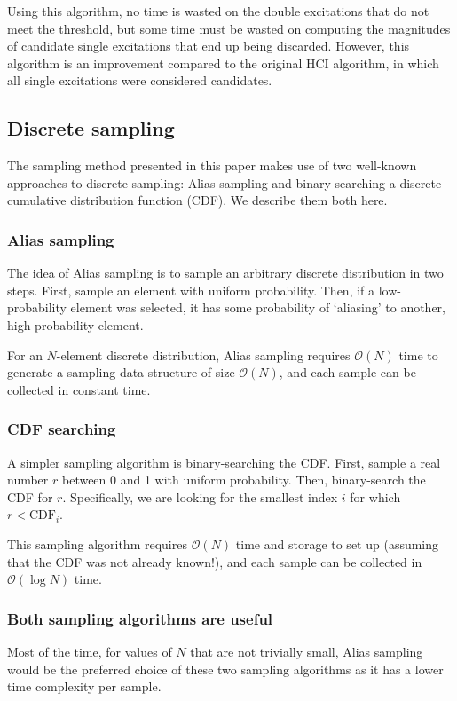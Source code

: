 \documentclass[english]{article}
\begin{document}
Using this algorithm, no time is wasted on the double excitations that do not meet the threshold, but some time must be wasted on computing the magnitudes of candidate single excitations that end up being discarded. However, this algorithm is an improvement compared to the original HCI algorithm, in which all single excitations were considered candidates.


\subsection{Discrete sampling}
The sampling method presented in this paper makes use of two well-known approaches to discrete sampling: Alias sampling and binary-searching a discrete cumulative distribution function (CDF). We describe them both here.

\subsubsection{Alias sampling}
The idea of Alias sampling is to sample an arbitrary discrete distribution in two steps. First, sample an element with uniform probability. Then, if a low-probability element was selected, it has some probability of `aliasing' to another, high-probability element.

For an $N$-element discrete distribution, Alias sampling requires $\mathcal{O}(N)$ time to generate a sampling data structure of size $\mathcal{O}(N)$, and each sample can be collected in constant time.

\subsubsection{CDF searching}
A simpler sampling algorithm is binary-searching the CDF. First, sample a real number $r$ between 0 and 1 with uniform probability. Then, binary-search the CDF for $r$. Specifically, we are looking for the smallest index $i$ for which $r<\textrm{CDF}_i$.

This sampling algorithm requires $\mathcal{O}(N)$ time and storage to set up (assuming that the CDF was not already known!), and each sample can be collected in $\mathcal{O}(\log N)$ time.

\subsubsection{Both sampling algorithms are useful}
Most of the time, for values of $N$ that are not trivially small, Alias sampling would be the preferred choice of these two sampling algorithms as it has a lower time complexity per sample.
\end{document}
